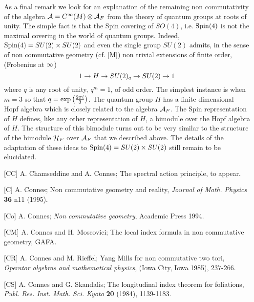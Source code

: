 \smallskip

\noindent As a final remark we look for an explanation of
the remaining non commutativity of the algebra ${\cal A} =
C^{\infty} (M) \otimes {\cal A}_F$ from the theory of quantum groups
at roots of unity. The simple fact is that the Spin
covering of $SO(4)$, i.e. $\mathop{\rm Spin}\nolimits (4)$ is not the maximal
covering in the world of quantum groups. Indeed, $\mathop{\rm Spin}\nolimits
(4) = SU(2) \times SU(2)$ and even the single group $SU(2)$
admits, in the sense of non commutative geometry (cf.
[M]) non trivial extensions of finite order, (Frobenius
at $\infty$)
$$
1 \rightarrow H \rightarrow SU(2)_q \rightarrow SU(2) \rightarrow 1
$$
where $q$ is any root of unity, $q^m =1$, of odd order.
The simplest instance is when $m=3$ so that $q=\exp
\left( {2\pi i \over 3}\right)$. The quantum group $H$
has a finite dimensional Hopf algebra which is closely
related to the algebra ${\cal A}_F$. The Spin representation
of $H$ defines, like any other representation of $H$, a
bimodule over the Hopf algebra of $H$. The structure of
this bimodule turns out to be very similar to the
structure of the bimodule ${\cal H}_F$ over ${\cal A}_F$ that we
described above. The details of the adaptation of these
ideas to $\mathop{\rm Spin}\nolimits (4) = SU (2) \times SU(2)$ still remain to be
elucidated.

\vfill\eject


\medskip

\item{[CC]} A. Chamseddine and A. Connes; The
spectral action principle, to appear.

\item{[C]} A. Connes; Non commutative geometry and
reality, {\it Journal of Math. Physics} {\bf 36} n11
(1995).

\item{[Co]} A. Connes; {\it Non commutative geometry},
Academic Press 1994.

\item{[CM]} A. Connes and H. Moscovici; The local index
formula in non commutative geometry, GAFA.

\item{[CR]} A. Connes and M. Rieffel; Yang Mills for non
commutative two tori, {\it Operator algebras and
mathematical physics}, (Iowa City, Iowa 1985), 237-266.

\item{[CS]} A. Connes and G. Skandalis; The longitudinal
index theorem for foliations, {\it Publ. Res. Inst. Math.
Sci. Kyoto} {\bf 20} (1984), 1139-1183.

